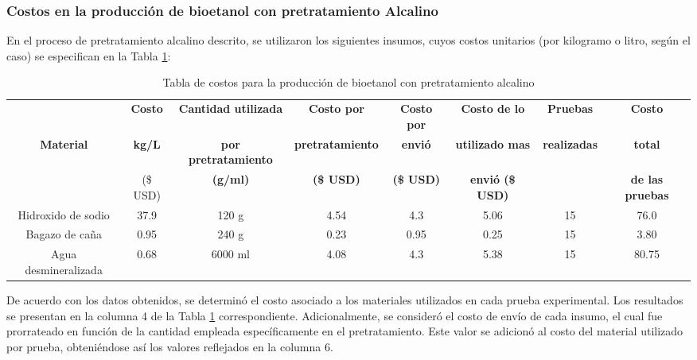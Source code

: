 \documentclass[12pt]{article}
\begin{document}
			\subsubsection{Costos en la producción de bioetanol con pretratamiento Alcalino}
			
En el proceso de pretratamiento alcalino descrito, se utilizaron los siguientes insumos, cuyos costos unitarios (por kilogramo o litro, según el caso) se especifican en la Tabla \ref{Costo para pretratamiento alcalino}:


			
				\begin{table}[H]
				\centering
				\caption{Tabla de costos para la producción de bioetanol con pretratamiento alcalino}
				\label{Costo para pretratamiento alcalino}
				\resizebox{16cm}{!} {
					\begin{tabular}{|c|c|c|c|c|c|c|c|}
						\hline
									& \textbf{Costo}& \textbf{Cantidad utilizada } &\textbf{Costo por }  &\textbf{Costo por }  & \textbf{Costo de lo }  &\textbf{Pruebas} & \textbf{Costo } \\
					\textbf{Material}&	\textbf{kg/L} & 	\textbf{por pretratamiento} & \textbf{pretratamiento} & \textbf{envió} & \textbf{utilizado mas }  & \textbf{realizadas } & \textbf{total }  \\
								 	& 			(\$ USD)		& \textbf{(g/ml)} &\textbf{	(\$ USD) } &\textbf{(\$ USD)}  & \textbf{envió (\$ USD)} & & \textbf{de las pruebas}\\ \hline		
						Hidroxido de sodio&37.9& 120 g & 4.54& 4.3 & 5.06& 15 &76.0\\ \hline
						Bagazo de caña 	  &0.95& 240 g  &0.23 & 0.95 & 0.25 & 15  &3.80 \\ \hline
						Agua desmineralizada&0.68& 6000 ml& 4.08& 4.3 & 5.38 & 15 & 80.75 \\ \hline
				\end{tabular} }
				
			\end{table}
     De acuerdo con los datos obtenidos, se determinó el costo asociado a los materiales utilizados en cada prueba experimental. Los resultados se presentan en la columna 4 de la Tabla \ref{Costo para pretratamiento alcalino} correspondiente. Adicionalmente, se consideró el costo de envío de cada insumo, el cual fue prorrateado en función de la cantidad empleada específicamente en el pretratamiento. Este valor se adicionó al costo del material utilizado por prueba, obteniéndose así los valores reflejados en la columna 6.
\end{document}
